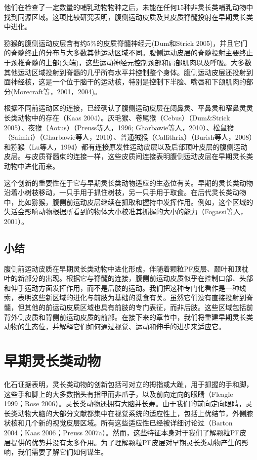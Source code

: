 他们在检查了一定数量的哺乳动物物种之后，未能在任何15种非灵长类哺乳动物中找到同源区域。这项比较研究表明，腹侧运动皮质及其皮质脊髓投射在早期灵长类中进化。

猕猴的腹侧运动皮层含有约5\%的皮质脊髓神经元(Dum和Strick 2005)，并且它们的脊髓终止的分布与大多数其他运动区域不同。腹侧运动皮层的脊髓投射主要终止于颈椎脊髓的上部(头端)，这些运动神经元控制颈部和肩部肌肉以及呼吸。大多数其他运动区域投射到脊髓的几乎所有水平并控制整个身体。腹侧运动皮层还投射到面神经核，这是一个位于脑干的运动核，特别是控制下半脸、嘴唇和下颌肌肉的部分(Morecraft等，2001，2004)。

根据不同前运动区的连接，已经确认了腹侧运动皮层在阔鼻灵、平鼻灵和窄鼻灵灵长类动物中的存在（Kaas 2004）。灰毛猴、卷尾猴（Cebus）（Dum\&Strick 2005）、夜猴（Aotus）（Preuss等人，1996; Gharbawie等人，2010）、松鼠猴（Saimiri）（Gharbawie等人，2010）、普通狨猴（Callithrix）（Burish等人，2008）和猕猴（Lu等人，1994）都有连接原发性运动皮层以及后部顶叶皮层的腹侧运动皮层。与皮质脊髓束的连接一样，这些皮质间连接表明腹侧运动皮层在早期灵长类动物中进化而来。

这个创新的重要性在于它与早期灵长类动物适应的生态位有关。早期的灵长类动物沿着小树枝移动，一只手用于抓住树枝，另一只手用于取食。在后代灵长类动物中，比如猕猴，腹侧前运动皮层继续在抓取和握持中发挥作用。例如，这个区域的失活会影响动物根据所看到的物体大小校准其抓握的大小的能力（Fogassi等人，2001）。

\subsection{小结}
腹侧前运动皮质在早期灵长类动物中进化形成，伴随着颗粒PF皮层、颞叶和顶枕叶的新部分的出现。根据它与脊髓的连接，腹侧前运动皮质似乎在控制口部、头部和伸手运动方面发挥作用，而不是后肢的运动。我们把这种专门化看作是一种线索，表明这些新区域的进化与前肢为基础的觅食有关。虽然它们没有直接投射到脊髓，但其他的前运动皮质区域也具有前肢的专门表征，而非后肢。这些区域包括前背外侧皮质和背侧前运动皮质的前部。在接下来的章节中，我们将重建早期灵长类动物的生态位，并解释它们如何通过视觉、运动和伸手的进步来适应它。

\section{早期灵长类动物}
化石证据表明，灵长类动物的创新包括可对立的拇指或大趾，用于抓握的手和脚，这些手和脚上的大多数指头有指甲而非爪子，以及前向定向的眼睛（Fleagle 1999；Rose 2006）。灵长类动物还拥有大脑并长寿。由于我们的前向定向眼睛，灵长类动物大脑的大部分文献都集中在视觉系统的适应性上，包括上优结节，外侧膝状核和几个新的视觉皮层区域。所有这些适应性已经被详细讨论过（Barton 2004；Kaas 2006；Preuss 2007a）。然而，这些特征本身对于我们了解颗粒PF皮层提供的优势并没有太多作用。为了理解颗粒PF皮层对早期灵长类动物产生的影响，我们需要了解它们如何谋生。

